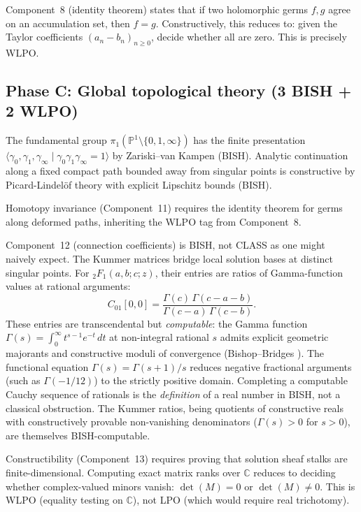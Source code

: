 \documentclass[11pt,a4paper]{article}
\theoremstyle{plain}
\theoremstyle{definition}
\newcommand{\BISH}{\textsf{BISH}}
\newcommand{\WLPO}{\textsf{WLPO}}
\newcommand{\LPO}{\textsf{LPO}}
\newcommand{\CLASS}{\textsf{CLASS}}
\newcommand{\C}{\mathbb{C}}
\newcommand{\PP}{\mathbb{P}}
\begin{document}
Component~8 (identity theorem) states that if two holomorphic germs $f, g$ agree on an accumulation set, then $f = g$.
Constructively, this reduces to: given the Taylor coefficients $(a_n - b_n)_{n \ge 0}$, decide whether all are zero.
This is precisely \WLPO.

\subsection{Phase C: Global topological theory (3 \BISH{} + 2 \WLPO)}

The fundamental group $\pi_1(\PP^1 \setminus \{0,1,\infty\})$ has the finite presentation $\langle \gamma_0, \gamma_1, \gamma_\infty \mid \gamma_0 \gamma_1 \gamma_\infty = 1 \rangle$ by Zariski--van Kampen (\BISH).
Analytic continuation along a fixed compact path bounded away from singular points is constructive by Picard-Lindel\"of theory with explicit Lipschitz bounds (\BISH).

Homotopy invariance (Component~11) requires the identity theorem for germs along deformed paths, inheriting the \WLPO{} tag from Component~8.

Component~12 (connection coefficients) is \BISH, not \CLASS{} as one might naively expect.
The Kummer matrices bridge local solution bases at distinct singular points.
For ${}_2F_1(a,b;c;z)$, their entries are ratios of Gamma-function values at rational arguments:
\[
C_{01}[0,0] = \frac{\Gamma(c)\,\Gamma(c-a-b)}{\Gamma(c-a)\,\Gamma(c-b)}.
\]
These entries are transcendental but \emph{computable}: the Gamma function $\Gamma(s) = \int_0^\infty t^{s-1} e^{-t}\,dt$ at non-integral rational $s$ admits explicit geometric majorants and constructive moduli of convergence (Bishop--Bridges \cite{BishopBridges1985}).
The functional equation $\Gamma(s) = \Gamma(s{+}1)/s$ reduces negative fractional arguments (such as $\Gamma(-1/12)$) to the strictly positive domain.
Completing a computable Cauchy sequence of rationals is the \emph{definition} of a real number in \BISH, not a classical obstruction.
The Kummer ratios, being quotients of constructive reals with constructively provable non-vanishing denominators ($\Gamma(s) > 0$ for $s > 0$), are themselves \BISH-computable.

Constructibility (Component~13) requires proving that solution sheaf stalks are finite-dimensional.
Computing exact matrix ranks over $\C$ reduces to deciding whether complex-valued minors vanish: $\det(M) = 0$ or $\det(M) \neq 0$.
This is \WLPO{} (equality testing on $\C$), not \LPO{} (which would require real trichotomy).
\end{document}

